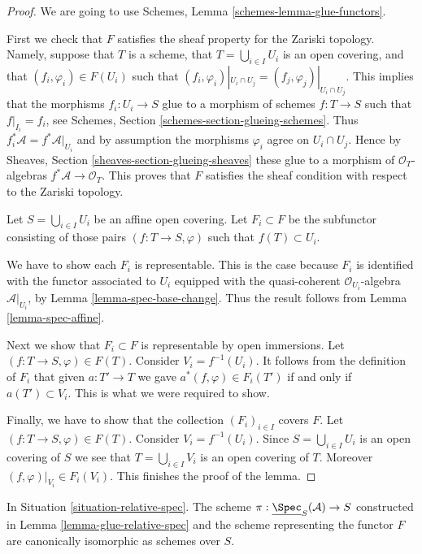 \begin{proof}
We are going to use Schemes, Lemma \ref{schemes-lemma-glue-functors}.

\medskip\noindent
First we check that $F$ satisfies the sheaf property for the
Zariski topology. Namely, suppose that $T$ is a scheme,
that $T = \bigcup_{i \in I} U_i$ is an open covering,
and that $(f_i, \varphi_i) \in F(U_i)$ such that
$(f_i, \varphi_i)|_{U_i \cap U_j} = (f_j, \varphi_j)|_{U_i \cap U_j}$.
This implies that the morphisms $f_i : U_i \to S$
glue to a morphism of schemes $f : T \to S$ such that
$f|_{I_i} = f_i$, see Schemes, Section \ref{schemes-section-glueing-schemes}.
Thus $f_i^*\mathcal{A} = f^*\mathcal{A}|_{U_i}$ and by assumption the
morphisms $\varphi_i$ agree on $U_i \cap U_j$. Hence by Sheaves,
Section \ref{sheaves-section-glueing-sheaves} these glue to a
morphism of $\mathcal{O}_T$-algebras $f^*\mathcal{A} \to \mathcal{O}_T$.
This proves that $F$ satisfies the sheaf condition with respect to
the Zariski topology.

\medskip\noindent
Let $S = \bigcup_{i \in I} U_i$ be an affine open covering.
Let $F_i \subset F$ be the subfunctor consisting of
those pairs $(f : T \to S, \varphi)$ such that
$f(T) \subset U_i$.

\medskip\noindent
We have to show each $F_i$ is representable.
This is the case because $F_i$ is identified with
the functor associated to $U_i$ equipped with
the quasi-coherent $\mathcal{O}_{U_i}$-algebra $\mathcal{A}|_{U_i}$,
by Lemma \ref{lemma-spec-base-change}.
Thus the result follows from Lemma \ref{lemma-spec-affine}.

\medskip\noindent
Next we show that $F_i \subset F$ is representable by open immersions.
Let $(f : T \to S, \varphi) \in F(T)$. Consider $V_i = f^{-1}(U_i)$.
It follows from the definition of $F_i$ that given $a : T' \to T$
we gave $a^*(f, \varphi) \in F_i(T')$ if and only if $a(T') \subset V_i$.
This is what we were required to show.

\medskip\noindent
Finally, we have to show that the collection $(F_i)_{i \in I}$
covers $F$. Let $(f : T \to S, \varphi) \in F(T)$.
Consider $V_i = f^{-1}(U_i)$. Since $S = \bigcup_{i \in I} U_i$
is an open covering of $S$ we see that $T = \bigcup_{i \in I} V_i$
is an open covering of $T$. Moreover $(f, \varphi)|_{V_i} \in F_i(V_i)$.
This finishes the proof of the lemma.
\end{proof}

\begin{lemma}
\label{lemma-glueing-gives-functor-spec}
In Situation \ref{situation-relative-spec}.
The scheme $\pi : \underline{\Spec}_S(\mathcal{A}) \to S$
constructed in Lemma \ref{lemma-glue-relative-spec}
and the scheme representing the functor $F$ are
canonically isomorphic as schemes over $S$.
\end{lemma}

